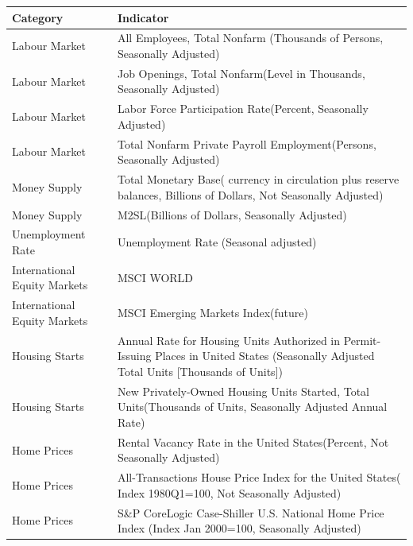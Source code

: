 \begin{center}
\begin{singlespace}    
\begin{scriptsize}
\begin{longtable}{p{}|p{}}
        \toprule
        \textbf{Category}  & \textbf{Indicator} \\
        \hline
        Labour Market  & All Employees, Total Nonfarm (Thousands of Persons, Seasonally Adjusted) \\
        \hline
        Labour Market  & Job Openings, Total Nonfarm(Level in Thousands, Seasonally Adjusted) \\
        \hline
        Labour Market  & Labor Force Participation Rate(Percent, Seasonally Adjusted) \\
        \hline
        Labour Market  & Total Nonfarm Private Payroll Employment(Persons, Seasonally Adjusted) \\
        \hline
        Money Supply  & Total Monetary Base( currency in circulation plus reserve balances, Billions of Dollars, Not Seasonally Adjusted) \\
        \hline
        Money Supply  & M2SL(Billions of Dollars, Seasonally Adjusted) \\
        \hline
        Unemployment Rate  & Unemployment Rate (Seasonal adjusted) \\
        \hline
        International Equity Markets  & MSCI WORLD \\
        \hline
        International Equity Markets  & MSCI Emerging Markets Index(future) \\
        \hline
        Housing Starts  & Annual Rate for Housing Units Authorized in Permit-Issuing Places in United States (Seasonally Adjusted Total Units [Thousands of Units]) \\
        \hline
        Housing Starts  & New Privately-Owned Housing Units Started, Total Units(Thousands of Units, Seasonally Adjusted Annual Rate) \\
        \hline
        Home Prices  & Rental Vacancy Rate in the United States(Percent, Not Seasonally Adjusted) \\
        \hline
        Home Prices  & All-Transactions House Price Index for the United States( Index 1980Q1=100, Not Seasonally Adjusted) \\
        \hline
        Home Prices  & S\&P CoreLogic Case-Shiller U.S. National Home Price Index (Index Jan 2000=100, Seasonally Adjusted) \\

\end{longtable}
\end{scriptsize}
\end{singlespace}
\end{center}

